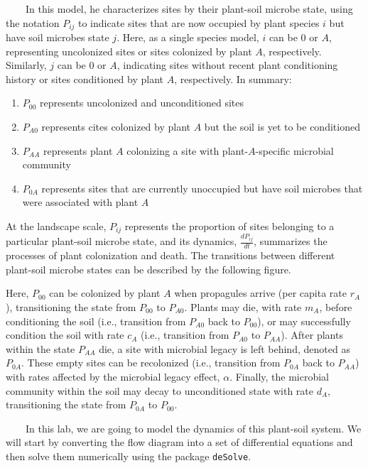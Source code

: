 \documentclass[
]{book}
\providecommand{\tightlist}{%
  \setlength{\itemsep}{0pt}\setlength{\parskip}{0pt}}
\begin{document}
~~~~In this model, he characterizes sites by their plant-soil microbe state, using the notation \(P_{ij}\) to indicate sites that are now occupied by plant species \(i\) but have soil microbes state \(j\). Here, as a single species model, \(i\) can be 0 or \(A\), representing uncolonized sites or sites colonized by plant \(A\), respectively. Similarly, \(j\) can be 0 or \(A\), indicating sites without recent plant conditioning history or sites conditioned by plant \(A\), respectively. In summary:

\begin{enumerate}
\def\labelenumi{\arabic{enumi}.}
\tightlist
\item
  \(P_{00}\) represents uncolonized and unconditioned sites
\item
  \(P_{A0}\) represents cites colonized by plant \(A\) but the soil is yet to be conditioned
\item
  \(P_{AA}\) represents plant \(A\) colonizing a site with plant-\(A\)-specific microbial community
\item
  \(P_{0A}\) represents sites that are currently unoccupied but have soil microbes that were associated with plant \(A\)
\end{enumerate}

At the landscape scale, \(P_{ij}\) represents the proportion of sites belonging to a particular plant-soil microbe state, and its dynamics, \(\frac {dP_{ij}}{dt}\), summarizes the processes of plant colonization and death. The transitions between different plant-soil microbe states can be described by the following figure.

Here, \(P_{00}\) can be colonized by plant \(A\) when propagules arrive (per capita rate \(r_{A}\)), transitioning the state from \(P_{00}\) to \(P_{A0}\). Plants may die, with rate \(m_{A}\), before conditioning the soil (i.e., transition from \(P_{A0}\) back to \(P_{00}\)), or may successfully condition the soil with rate \(c_{A}\) (i.e., transition from \(P_{A0}\) to \(P_{AA}\)). After plants within the state \(P_{AA}\) die, a site with microbial legacy is left behind, denoted as \(P_{0A}\). These empty sites can be recolonized (i.e., transition from \(P_{0A}\) back to \(P_{AA}\)) with rates affected by the microbial legacy effect, \(\alpha\). Finally, the microbial community within the soil may decay to unconditioned state with rate \(d_{A}\), transitioning the state from \(P_{0A}\) to \(P_{00}\).

~~~~In this lab, we are going to model the dynamics of this plant-soil system. We will start by converting the flow diagram into a set of differential equations and then solve them numerically using the package \texttt{deSolve}.
\end{document}
